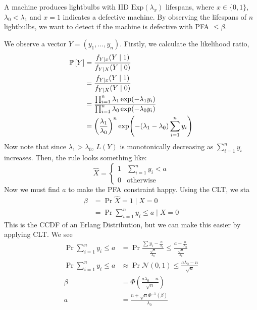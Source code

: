 \begin{example}
    A machine produces lightbulbs with IID $\text{Exp}(\lambda_x)$ lifespans, where $x \in \{0, 1\}$, $\lambda_0 < \lambda_1$ and $x = 1$ indicates
    a defective machine. By observing the lifespans of $n$ lightbulbs, we want to detect if the machine is defective with PFA $\leq \beta$.
    
    We observe a vector $Y = (y_1, \dots, y_n)$. Firstly, we calculate the likelihood ratio,
    \begin{align*}
        \mathbb{P}\left[ Y \right] &= \frac{f_{Y \mid x}(Y \mid 1)}{f_{Y \mid X}(Y \mid 0)}\\
        &= \frac{f_{Y \mid x}(Y \mid 1)}{f_{Y \mid X}(Y \mid 0)}\\
        &= \frac{\prod_{i = 1}^n \lambda_1 \exp(- \lambda_1 y_i)}{\prod_{i = 1}^n \lambda_0 \exp(- \lambda_0 y_i)} \\
        &= \qty(\frac{\lambda_1}{\lambda_0})^n \exp(-(\lambda_1 - \lambda_0) \sum_{i = 1}^n y_i)
    \end{align*}
    Now note that since $\lambda_1 > \lambda_0$, $L(Y)$ is monotonically decreasing as $\sum_{i=1}^n y_i$ increases. Then, the rule looks something like:
    \[ \hat{X} = \begin{cases}
        1 & \sum_{i=1}^n y_i < a \\
        0 & \text{otherwise}
    \end{cases}\]
    Now we must find $a$ to make the PFA constraint happy. Using the CLT, we sta
    \begin{align*}
        \beta &= \Pr{\hat{X} = 1 \mid X = 0} \\
        &= \Pr{\sum_{i = 1}^n y_i \leq a \mid X = 0}
    \end{align*}
    This is the CCDF of an Erlang Distribution, but we can make this easier by applying CLT.
    We see 
    \begin{align*}
        \Pr{\sum_{i = 1}^n y_i \leq a} &= \Pr{\frac{\sum y_i - \frac{n}{\lambda_0}}{\frac{\sqrt{n}}{\lambda_0}} \leq \frac{a - \frac{n}{\lambda_0}}{\frac{\sqrt{n}}{\lambda_0}}} \\
        \Pr{\sum_{i = 1}^n y_i \leq a} &\approx \Pr{\mathcal{N}(0, 1) \leq \frac{a \lambda_0 - n}{\sqrt{n}}} \\
        \beta &= \Phi(\frac{a \lambda_0 - n}{\sqrt{n}})\\
        a &= \frac{n + \sqrt{n} \Phi^{-1}(\beta)}{\lambda_0}
    \end{align*}
\end{example}

